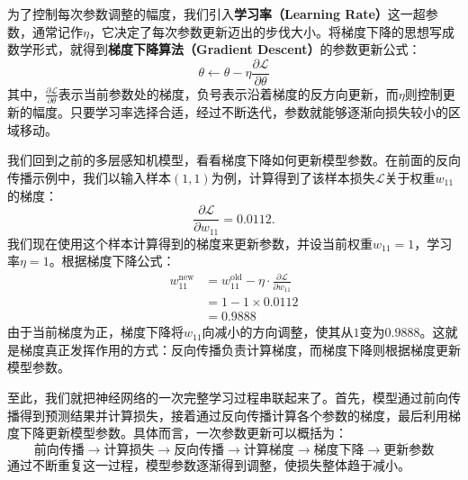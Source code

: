 为了控制每次参数调整的幅度，我们引入\textbf{学习率（Learning Rate）}这一超参数，通常记作$\eta$，它决定了每次参数更新迈出的步伐大小。将梯度下降的思想写成数学形式，就得到\textbf{梯度下降算法（Gradient Descent）}的参数更新公式：
$$
\theta\leftarrow\theta-\eta\frac{\partial\mathcal{L}}{\partial\theta}
$$
其中，$\frac{\partial\mathcal{L}}{\partial\theta}$表示当前参数处的梯度，负号表示沿着梯度的反方向更新，而$\eta$则控制更新的幅度。只要学习率选择合适，经过不断迭代，参数就能够逐渐向损失较小的区域移动。

我们回到之前的多层感知机模型，看看梯度下降如何更新模型参数。在前面的反向传播示例中，我们以输入样本$(1,1)$为例，计算得到了该样本损失$\mathcal{L}$关于权重$w_{11}$的梯度：
$$
\frac{\partial\mathcal{L}}{\partial w_{11}}=0.0112.
$$
我们现在使用这个样本计算得到的梯度来更新参数，并设当前权重$w_{11}=1$，学习率$\eta=1$。根据梯度下降公式：
\begin{align*}
w_{11}^{\text{new}} &= w_{11}^{\text{old}} - \eta \cdot \frac{\partial \mathcal{L}}{\partial w_{11}} \\
&= 1 - 1 \times 0.0112 \\
&= 0.9888
\end{align*}
由于当前梯度为正，梯度下降将$w_{11}$向减小的方向调整，使其从$1$变为$0.9888$。这就是梯度真正发挥作用的方式：反向传播负责计算梯度，而梯度下降则根据梯度更新模型参数。

至此，我们就把神经网络的一次完整学习过程串联起来了。首先，模型通过前向传播得到预测结果并计算损失，接着通过反向传播计算各个参数的梯度，最后利用梯度下降更新模型参数。具体而言，一次参数更新可以概括为：
$$
\text{前向传播} \rightarrow \text{计算损失} \rightarrow \text{反向传播} \rightarrow \text{计算梯度} \rightarrow \text{梯度下降} \rightarrow \text{更新参数}
$$
通过不断重复这一过程，模型参数逐渐得到调整，使损失整体趋于减小。

